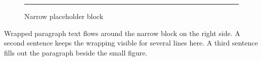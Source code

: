 \documentclass{article}
\begin{document}
\begin{figure}
\rule{3.5cm}{2cm}
\caption{Narrow placeholder block}
\end{figure}
Wrapped paragraph text flows around the narrow block on the right side.
A second sentence keeps the wrapping visible for several lines here.
A third sentence fills out the paragraph beside the small figure.
\end{document}
